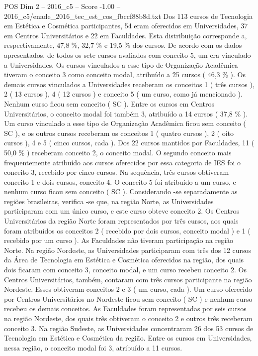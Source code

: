 \begin{textsample}{POS Dim 2 – 2016\_c5 – Score -1.00 – 2016\_c5/enade\_2016\_tec\_est\_cos\_fbccf88b8d.txt}
Dos 113 cursos de Tecnologia em Estética e Cosmética participantes, 54 eram oferecidos em Universidades, 37 em Centros Universitários e 22 em Faculdades.
Esta distribuição corresponde a, respectivamente, 47,8 \%, 32,7 \% e 19,5 \% dos cursos.
De acordo com os dados apresentados, de todos os sete cursos avaliados com conceito 5, um era vinculado a Universidades.
Os cursos vinculados a esse tipo de Organização Acadêmica tiveram o conceito 3 como conceito modal, atribuído a 25 cursos ( 46,3 \% ).
Os demais cursos vinculados a Universidades receberam os conceitos 1 ( três cursos ), 2 ( 13 cursos ), 4 ( 12 cursos ) e conceito 5 ( um curso, como já mencionado ).
Nenhum curso ficou sem conceito ( SC ).
Entre os cursos em Centros Universitários, o conceito modal foi também 3, atribuído a 14 cursos ( 37,8 \% ).
Um curso vinculado a esse tipo de Organização Acadêmica ficou sem conceito ( SC ), e os outros cursos receberam os conceitos 1 ( quatro cursos ), 2 ( oito cursos ), 4 e 5 ( cinco cursos, cada ).
Dos 22 cursos mantidos por Faculdades, 11 ( 50,0 \% ) receberam conceito 2, o conceito modal.
O segundo conceito mais frequentemente atribuído aos cursos oferecidos por essa categoria de IES foi o conceito 3, recebido por cinco cursos.
Na sequência, três cursos obtiveram conceito 1 e dois cursos, conceito 4.
O conceito 5 foi atribuído a um curso, e nenhum curso ficou sem conceito ( SC ).
Considerando -se separadamente as regiões brasileiras, verifica -se que, na região Norte, as Universidades participaram com um único curso, e este curso obteve conceito 2.
Os Centros Universitários da região Norte foram representados por três cursos, aos quais foram atribuídos os conceitos 2 ( recebido por dois cursos, conceito modal ) e 1 ( recebido por um curso ).
As Faculdades não tiveram participação na região Norte.
Na região Nordeste, as Universidades participaram com três dos 12 cursos da Área de Tecnologia em Estética e Cosmética oferecidos na região, dos quais dois ficaram com conceito 3, conceito modal, e um curso recebeu conceito 2.
Os Centros Universitários, também, contaram com três cursos participante na região Nordeste.
Esses obtiveram conceitos 2 e 3 ( um curso, cada ).
Um curso oferecido por Centros Universitários no Nordeste ficou sem conceito ( SC ) e nenhum curso recebeu os demais conceitos.
As Faculdades foram representadas por seis cursos na região Nordeste, dos quais três obtiveram o conceito 2 e outros três receberam conceito 3.
Na região Sudeste, as Universidades concentraram 26 dos 53 cursos de Tecnologia em Estética e Cosmética da região.
Entre os cursos em Universidades, nessa região, o conceito modal foi 3, atribuído a 11 cursos.

\end{textsample}
